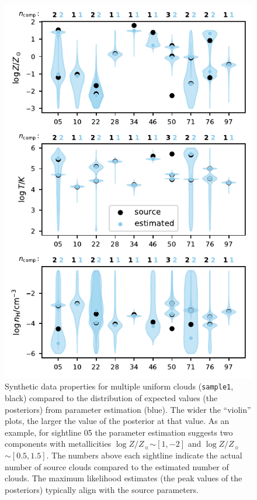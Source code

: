 \documentclass[fleqn,usenatbib]{mnras}
\newcommand{\metallicity}{$\log Z/Z_{\sun}$}
\begin{document}
\begin{figure}
    \centering
    \includegraphics[width=\columnwidth]{figures/sample1/comparison.pdf}
    \caption{
    Synthetic data properties for multiple uniform clouds (\texttt{sample1}, black) compared to the distribution of expected values (the posteriors) from parameter estimation (blue).
    The wider the ``violin'' plots, the larger the value of the posterior at that value.
    As an example, for sightline 05 the parameter estimation suggests two components with metallicities \metallicity $\sim [ 1, -2]$ and \metallicity $\sim [ 0.5, 1.5 ]$.
    The numbers above each sightline indicate the actual number of source clouds compared to the estimated number of clouds.
    The maximum likelihood estimates (the peak values of the posteriors) typically align with the source parameters.
    }
    \label{f: sample1 violin}
\end{figure}
\end{document}
